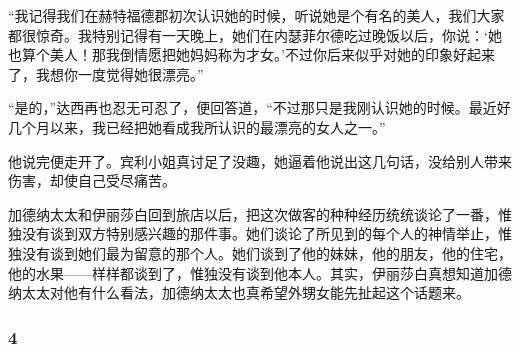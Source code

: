\par “我记得我们在赫特福德郡初次认识她的时候，听说她是个有名的美人，我们大家都很惊奇。我特别记得有一天晚上，她们在内瑟菲尔德吃过晚饭以后，你说：‘她也算个美人！那我倒情愿把她妈妈称为才女。’不过你后来似乎对她的印象好起来了，我想你一度觉得她很漂亮。”
\par “是的，”达西再也忍无可忍了，便回答道，“不过那只是我刚认识她的时候。最近好几个月以来，我已经把她看成我所认识的最漂亮的女人之一。”
\par 他说完便走开了。宾利小姐真讨足了没趣，她逼着他说出这几句话，没给别人带来伤害，却使自己受尽痛苦。
\par 加德纳太太和伊丽莎白回到旅店以后，把这次做客的种种经历统统谈论了一番，惟独没有谈到双方特别感兴趣的那件事。她们谈论了所见到的每个人的神情举止，惟独没有谈到她们最为留意的那个人。她们谈到了他的妹妹，他的朋友，他的住宅，他的水果——样样都谈到了，惟独没有谈到他本人。其实，伊丽莎白真想知道加德纳太太对他有什么看法，加德纳太太也真希望外甥女能先扯起这个话题来。



\subsubsection*{4}


